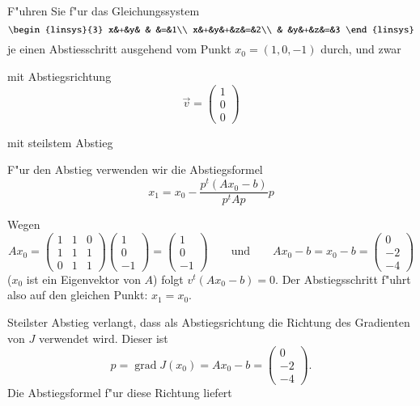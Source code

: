 F"uhren Sie f"ur das Gleichungssystem
\[
\begin{linsys}{3}
x&+&y& & &=&1\\
x&+&y&+&z&=&2\\
 & &y&+&z&=&3
\end{linsys}
\]
je einen Abstiesschritt ausgehend vom Punkt $x_0=(1,0,-1)$ durch, und zwar
\begin{teilaufgaben}
\item
mit Abstiegsrichtung
\[
\vec v=\begin{pmatrix}1\\0\\0\end{pmatrix}
\]
\item
mit steilstem Abstieg
\end{teilaufgaben}

\begin{loesung}
F"ur den Abstieg verwenden wir die Abstiegsformel
\[
x_1=x_0-\frac{p^t(Ax_0-b)}{p^tAp}p
\]
\begin{teilaufgaben}
\item
Wegen
\[
Ax_0=
\begin{pmatrix}
1&1&0\\
1&1&1\\
0&1&1
\end{pmatrix}
\begin{pmatrix}
1\\0\\-1
\end{pmatrix}
=
\begin{pmatrix}1\\0\\-1\end{pmatrix}
\qquad
\text{und}
\qquad
Ax_0-b
=
x_0-b
=
\begin{pmatrix}
0\\-2\\-4
\end{pmatrix}
\]
($x_0$ ist ein Eigenvektor von $A$) folgt
$v^t(Ax_0-b)=0$.
Der Abstiegsschritt f"uhrt also auf den gleichen Punkt: $x_1=x_0$.
\item
Steilster Abstieg verlangt, dass als Abstiegsrichtung die Richtung des
Gradienten von $J$ verwendet wird. 
Dieser ist
\[
p=\operatorname{grad}J(x_0)=Ax_0-b=\begin{pmatrix}0\\-2\\-4\end{pmatrix}.
\]
Die Abstiegsformel f"ur diese Richtung liefert
\begin{align*}

\end{align*}
\end{teilaufgaben}
\end{loesung}
